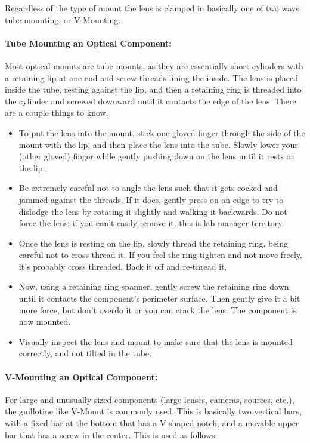 \documentclass[11pt]{article}
\begin{document}
Regardless of the type of mount the lens is clamped in basically one of two ways: tube mounting, or V-Mounting.

\paragraph{\textbf{Tube Mounting an Optical Component:}} Most optical mounts are tube mounts, as they are essentially short cylinders with a retaining lip at one end and screw threads lining the inside. The lens is placed inside the tube, resting against the lip, and then a retaining ring is threaded into the cylinder and screwed downward until it contacts the edge of the lens. There are a couple things to know.

\begin{itemize}[noitemsep]
    \item To put the lens into the mount, stick one gloved finger through the side of the mount with the lip, and then place the lens into the tube. Slowly lower your (other gloved) finger while gently pushing down on the lens until it rests on the lip. 
    \item Be extremely careful not to angle the lens such that it gets cocked and jammed against the threads. If it does, gently press on an edge to try to dislodge the lens by rotating it slightly and walking it backwards. Do not force the lens; if you can't easily remove it, this is lab manager territory.
    \item Once the lens is resting on the lip, slowly thread the retaining ring, being careful not to cross thread it. If you feel the ring tighten and not move freely, it's probably cross threaded. Back it off and re-thread it.
    \item Now, using a retaining ring spanner, gently screw the retaining ring down until it contacts the component's perimeter surface. Then gently give it a bit more force, but don't overdo it or you can crack the lens. The component is now mounted.
    \item Visually inspect the lens and mount to make sure that the lens is mounted correctly, and not tilted in the tube.
\end{itemize}

\paragraph{\textbf{V-Mounting an Optical Component:}} For large and unusually sized components (large lenses, cameras, sources, etc.), the guillotine like V-Mount is commonly used. This is basically two vertical bars, with a fixed bar at the bottom that has a V shaped notch, and a movable upper bar that has a screw in the center. This is used as follows:
\end{document}

